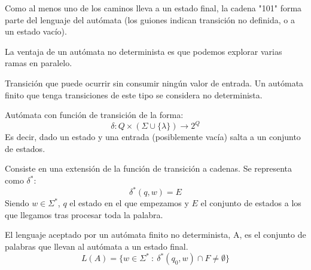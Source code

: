 \documentclass{apuntes}
\begin{document}
\begin{example}
\begin{tabbing}
 \end{tabbing}

Como al menos uno de los caminos lleva a un estado final, la cadena "101" forma parte del lenguaje del autómata (los guiones indican transición no definida, o a un estado vacío).

La ventaja de un autómata no determinista es que podemos explorar varias ramas en paralelo.
\end{example}


\begin{defn}
Transición que puede ocurrir sin consumir ningún valor de entrada. Un autómata finito que tenga transiciones de este tipo se considera no determinista.
\end{defn}

\begin{defn}
Autómata con función de transición de la forma:
\[\delta: Q\times (\Sigma \cup \lbrace \lambda \rbrace) \rightarrow 2^Q\]
Es decir, dado un estado y una entrada (posiblemente vacía) salta a un conjunto de estados.
\end{defn}

\begin{defn}
Consiste en una extensión de la función de transición a cadenas. Se representa como $\delta ^*$:
\[\delta^*(q, w) = E\]
Siendo $w\in \Sigma ^*$, $q$ el estado en el que empezamos y $E$ el conjunto de estados a los que llegamos tras procesar toda la palabra.
\end{defn}

\begin{defn}
El lenguaje aceptado por un autómata finito no determinista, A, es el conjunto de palabras que llevan al autómata a un estado final.
\[L(A) = \lbrace w \in \Sigma^* \ : \ \delta^*(q_0, w)\cap F \neq \emptyset \rbrace\]
\end{defn}
\end{document}
